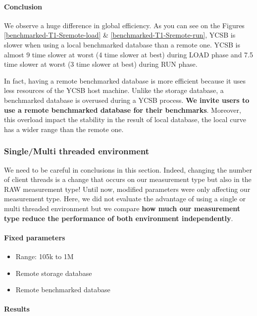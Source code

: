 \documentclass[a4paper,11pt]{report}
\begin{document}
\paragraph{Conclusion}

We observe a huge difference in global efficiency. As you can see on the Figures \ref{benchmarked-T1-Sremote-load} \& \ref{benchmarked-T1-Sremote-run}, YCSB is slower when using a local benchmarked database than a remote one. YCSB is almost 9 time slower at worst (4 time slower at best) during LOAD phase and  7.5 time slower at worst (3 time slower at best) during RUN phase. 

In fact, having a remote benchmarked database is more efficient because it uses less resources of the YCSB host machine. Unlike the storage database, a benchmarked database is overused during a YCSB process. \textbf{We invite users to use a remote benchmarked database for their benchmarks}. Moreover, this overload impact the stability in the result of local database, the local curve has a wider range than the remote one.

\clearpage

\subsubsection{Single/Multi threaded environment}

We need to be careful in conclusions in this section. Indeed, changing the number of client threads is a change that occurs on our measurement type but also in the RAW measurement type! Until now, modified parameters were only affecting our measurement type. Here, we did not evaluate the advantage of using a single or multi threaded environment but we compare \textbf{how much our measurement type reduce the performance of both environment independently}.


\paragraph{Fixed parameters}
\begin{itemize}
\item
Range: 105k to 1M
\item
Remote storage database
\item
Remote benchmarked database
\end{itemize}


\paragraph{Results}
\end{document}
